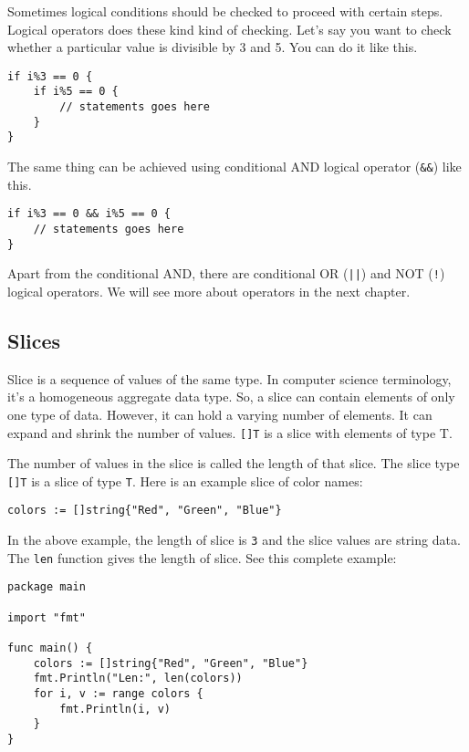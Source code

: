 Sometimes logical conditions should be checked to proceed with certain
steps.  Logical operators does these kind kind of checking.  Let's
say you want to check whether a particular value is divisible by 3
and 5.  You can do it like this.

\begin{lstlisting}[numbers=none]
if i%3 == 0 {
    if i%5 == 0 {
        // statements goes here
    }
}
\end{lstlisting}

The same thing can be achieved using conditional AND logical operator
(\texttt{\&\&}) like this.

\begin{lstlisting}[numbers=none]
if i%3 == 0 && i%5 == 0 {
    // statements goes here
}
\end{lstlisting}

Apart from the conditional AND, there are conditional OR (\texttt{||})
and NOT (\texttt{!}) logical operators.  We will see more about
operators in the next chapter.


\subsection{Slices}

Slice is a sequence of values of the same type.  In
computer science terminology, it's a homogeneous aggregate data type.
So, a slice can contain elements of only one type of data.  However,
it can hold a varying number of elements.  It can expand and shrink
the number of values.  \texttt{[]T} is a slice with elements of type
T.

The number of values in the slice is called the length of that slice.
The slice type \texttt{[]T} is a slice of type \texttt{T}.  Here is an
example slice of color names:

\begin{lstlisting}[numbers=none]
colors := []string{"Red", "Green", "Blue"}
\end{lstlisting}

In the above example, the length of slice is \texttt{3} and the slice
values are string data.  The \texttt{len} function gives the length of
slice.  See this complete example:

\begin{lstlisting}
package main

import "fmt"

func main() {
    colors := []string{"Red", "Green", "Blue"}
    fmt.Println("Len:", len(colors))
    for i, v := range colors {
        fmt.Println(i, v)
    }
}
\end{lstlisting}

